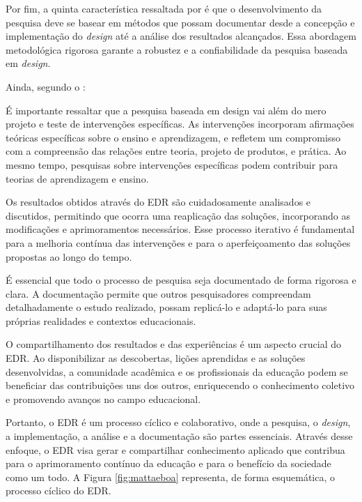 Por fim, a quinta característica ressaltada por  é que o desenvolvimento da pesquisa deve se basear em métodos que possam documentar desde a concepção e implementação do \textit{design} até a análise dos resultados alcançados. Essa abordagem metodológica rigorosa garante a robustez e a confiabilidade da pesquisa baseada em \textit{design}. 

Ainda, segundo o : 

\begin{quoting} 
[leftmargin=4cm, rightmargin=0cm]
\noindent
É importante ressaltar que a pesquisa baseada em design vai além do mero projeto e teste de intervenções específicas. As intervenções incorporam afirmações teóricas específicas sobre o ensino e aprendizagem, e refletem um compromisso com a compreensão das relações entre teoria, projeto de produtos, e prática. Ao mesmo tempo, pesquisas sobre intervenções específicas podem contribuir para teorias de aprendizagem e ensino.
\end{quoting}

Os resultados obtidos através do EDR são cuidadosamente analisados e discutidos, permitindo que ocorra uma reaplicação das soluções, incorporando as modificações e aprimoramentos necessários. Esse processo iterativo é fundamental para a melhoria contínua das intervenções e para o aperfeiçoamento das soluções propostas ao longo do tempo.

É essencial que todo o processo de pesquisa seja documentado de forma rigorosa e clara. A documentação permite que outros pesquisadores compreendam detalhadamente o estudo realizado, possam replicá-lo e adaptá-lo para suas próprias realidades e contextos educacionais.

O compartilhamento dos resultados e das experiências é um aspecto crucial do EDR. Ao disponibilizar as descobertas, lições aprendidas e as soluções desenvolvidas, a comunidade acadêmica e os profissionais da educação podem se beneficiar das contribuições uns dos outros, enriquecendo o conhecimento coletivo e promovendo avanços no campo educacional.

Portanto, o EDR é um processo cíclico e colaborativo, onde a pesquisa, o \textit{design}, a implementação, a análise e a documentação são partes essenciais. Através desse enfoque, o EDR visa gerar e compartilhar conhecimento aplicado que contribua para o aprimoramento contínuo da educação e para o benefício da sociedade como um todo. A Figura \ref{fig:mattaeboa} representa, de forma esquemática, o processo cíclico do EDR.

